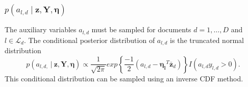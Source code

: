 \documentclass{article}
\begin{document}
\subsubsection{$p\left(a_{l,d}\mid\mathbf{z},\mathbf{Y},\mathbf{\eta}\right)$}
%
The auxiliary variables $a_{l,d}$ must be sampled for documents $d = 1, \ldots, D$ and $l \in \mathcal{L}_d$.  The conditional posterior distribution of $a_{l,d}$ is the truncated normal distribution
%
\begin{equation}
p\left(a_{l,d,} \ | \ \mathbf{z},\mathbf{Y},\mathbf{\eta}\right) \propto \frac{1}{\sqrt{2\pi}} exp \left\{ \frac{-1}{2}\left(a_{l,d} - \mathbf{\eta_l}^T\mathbf{\bar z}_d\right) \right\} I \left(a_{l,d} y_{l,d} > 0\right).
\end{equation}
This conditional distribution can be sampled using an inverse CDF method.
%
%
%
%
%
%
\end{document}
